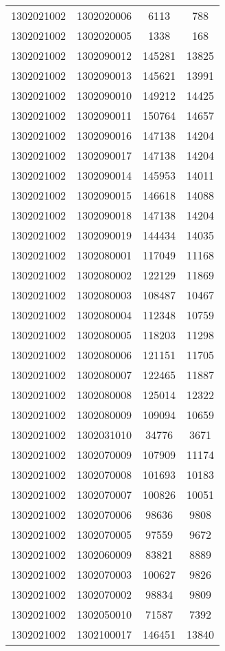 \begin{longtable}{llcc}
1302021002 & 1302020006 & 6113 & 788\\
1302021002 & 1302020005 & 1338 & 168\\
1302021002 & 1302090012 & 145281 & 13825\\
1302021002 & 1302090013 & 145621 & 13991\\
1302021002 & 1302090010 & 149212 & 14425\\
1302021002 & 1302090011 & 150764 & 14657\\
1302021002 & 1302090016 & 147138 & 14204\\
1302021002 & 1302090017 & 147138 & 14204\\
1302021002 & 1302090014 & 145953 & 14011\\
1302021002 & 1302090015 & 146618 & 14088\\
1302021002 & 1302090018 & 147138 & 14204\\
1302021002 & 1302090019 & 144434 & 14035\\
1302021002 & 1302080001 & 117049 & 11168\\
1302021002 & 1302080002 & 122129 & 11869\\
1302021002 & 1302080003 & 108487 & 10467\\
1302021002 & 1302080004 & 112348 & 10759\\
1302021002 & 1302080005 & 118203 & 11298\\
1302021002 & 1302080006 & 121151 & 11705\\
1302021002 & 1302080007 & 122465 & 11887\\
1302021002 & 1302080008 & 125014 & 12322\\
1302021002 & 1302080009 & 109094 & 10659\\
1302021002 & 1302031010 & 34776 & 3671\\
1302021002 & 1302070009 & 107909 & 11174\\
1302021002 & 1302070008 & 101693 & 10183\\
1302021002 & 1302070007 & 100826 & 10051\\
1302021002 & 1302070006 & 98636 & 9808\\
1302021002 & 1302070005 & 97559 & 9672\\
1302021002 & 1302060009 & 83821 & 8889\\
1302021002 & 1302070003 & 100627 & 9826\\
1302021002 & 1302070002 & 98834 & 9809\\
1302021002 & 1302050010 & 71587 & 7392\\
1302021002 & 1302100017 & 146451 & 13840\\

\end{longtable}
